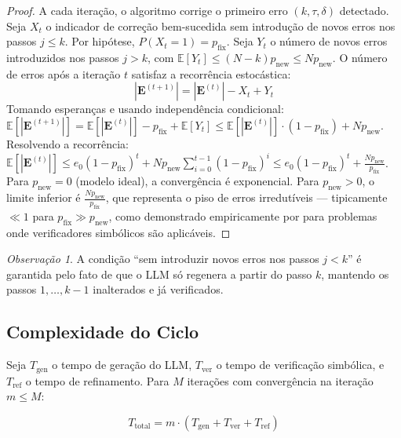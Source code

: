 \documentclass[5p]{elsarticle}
\theoremstyle{remark}
\newtheorem{remark}{Observação}[section]
\begin{document}
\begin{proof}
A cada iteração, o algoritmo corrige o primeiro erro $(k, \tau, \delta)$ detectado. Seja $X_t$ o indicador de correção bem-sucedida sem introdução de novos erros nos passos $j \leq k$. Por hipótese, $P(X_t = 1) = p_{\text{fix}}$. Seja $Y_t$ o número de novos erros introduzidos nos passos $j > k$, com $\mathbb{E}[Y_t] \leq (N - k)p_{\text{new}} \leq Np_{\text{new}}$. O número de erros após a iteração $t$ satisfaz a recorrência estocástica:
\begin{equation}
|\mathbf{E}^{(t+1)}| = |\mathbf{E}^{(t)}| - X_t + Y_t
\label{eq:recurrence}
\end{equation}
Tomando esperanças e usando independência condicional: $\mathbb{E}[|\mathbf{E}^{(t+1)}|] = \mathbb{E}[|\mathbf{E}^{(t)}|] - p_{\text{fix}} + \mathbb{E}[Y_t] \leq \mathbb{E}[|\mathbf{E}^{(t)}|] \cdot (1 - p_{\text{fix}}) + Np_{\text{new}}$. Resolvendo a recorrência: $\mathbb{E}[|\mathbf{E}^{(t)}|] \leq e_0(1-p_{\text{fix}})^t + Np_{\text{new}}\sum_{i=0}^{t-1}(1-p_{\text{fix}})^i \leq e_0(1-p_{\text{fix}})^t + \frac{Np_{\text{new}}}{p_{\text{fix}}}$. Para $p_{\text{new}} = 0$ (modelo ideal), a convergência é exponencial. Para $p_{\text{new}} > 0$, o limite inferior é $\frac{Np_{\text{new}}}{p_{\text{fix}}}$, que representa o piso de erros irredutíveis — tipicamente $\ll 1$ para $p_{\text{fix}} \gg p_{\text{new}}$, como demonstrado empiricamente por \cite{Frieder2024Mathematical} para problemas onde verificadores simbólicos são aplicáveis.
\end{proof}

\begin{remark}
A condição ``sem introduzir novos erros nos passos $j < k$'' é garantida pelo fato de que o LLM só regenera a partir do passo $k$, mantendo os passos $1,\ldots,k-1$ inalterados e já verificados.
\end{remark}

\subsection{Complexidade do Ciclo}

Seja $T_{\text{gen}}$ o tempo de geração do LLM, $T_{\text{ver}}$ o tempo de verificação simbólica, e $T_{\text{ref}}$ o tempo de refinamento. Para $M$ iterações com convergência na iteração $m \leq M$:

\begin{equation}
T_{\text{total}} = m \cdot (T_{\text{gen}} + T_{\text{ver}} + T_{\text{ref}})
\label{eq:complexity}
\end{equation}
\end{document}

